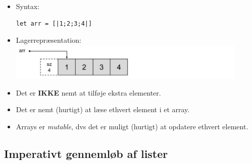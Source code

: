 \documentclass[rgb]{beamer}
\begin{document}
\begin{frame}[fragile]
\begin{footnotesize}

  \begin{itemize}
  \item Syntax:
\begin{lstlisting}[numbers=none,frame=none]
let arr = [|1;2;3;4|]
\end{lstlisting}

  \item Lagerrepræsentation: \\
    \includegraphics[width=0.9\textwidth]{array1234.png}
  \item Det er \textbf{IKKE} nemt at tilføje ekstra elementer.
  \item Det er nemt (hurtigt) at læse ethvert element i et array.

  \item Arrays er \emph{mutable}, dvs det er muligt (hurtigt) at
    opdatere ethvert element.
  \end{itemize}
\end{footnotesize}
\end{frame}


\subsection{Imperativt gennemløb af lister}
\end{document}
